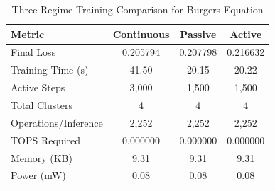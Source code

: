 \begin{table}[htbp]
\centering
\caption{Three-Regime Training Comparison for Burgers Equation}
\label{tab:three_regime_comparison}
\begin{tabular}{l|ccc}
\hline
\textbf{Metric} & \textbf{Continuous} & \textbf{Passive} & \textbf{Active} \\
\hline
Final Loss & 0.205794 & 0.207798 & 0.216632 \\
Training Time (s) & 41.50 & 20.15 & 20.22 \\
Active Steps & 3,000 & 1,500 & 1,500 \\
Total Clusters & 4 & 4 & 4 \\
Operations/Inference & 2,252 & 2,252 & 2,252 \\
TOPS Required & 0.000000 & 0.000000 & 0.000000 \\
Memory (KB) & 9.31 & 9.31 & 9.31 \\
Power (mW) & 0.08 & 0.08 & 0.08 \\
\hline
\end{tabular}
\end{table}

